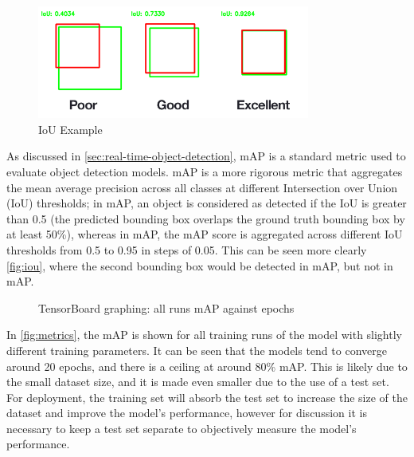 \begin{figure}[H]
    \centering
    \includegraphics[width=0.8\textwidth]{imgs/articles/iou.png}
    \caption{IoU Example \cite{rosebrock_2016}}
    \label{fig:iou}
  \end{figure}
  
As discussed in \autoref{sec:real-time-object-detection}, mAP is a standard metric used to evaluate object detection models. mAP is a more rigorous metric that aggregates the mean average precision across all classes at different Intersection over Union (IoU) thresholds; in mAP, an object is considered as detected if the IoU is greater than 0.5 (the predicted bounding box overlaps the ground truth bounding box by at least 50\%), whereas in mAP, the mAP score is aggregated across different IoU thresholds from 0.5 to 0.95 in steps of 0.05. This can be seen more clearly \autoref{fig:iou}, where the second bounding box would be detected in mAP, but not in mAP.
  
\begin{figure}[H]
  \centering
   
  \caption{TensorBoard graphing: all runs mAP against epochs}
  \label{fig:metrics}
\end{figure}
  
In \autoref{fig:metrics}, the mAP is shown for all training runs of the model with slightly different training parameters. It can be seen that the models tend to converge around 20 epochs, and there is a ceiling at around 80\% mAP. This is likely due to the small dataset size, and it is made even smaller due to the use of a test set. For deployment, the training set will absorb the test set to increase the size of the dataset and improve the model's performance, however for discussion it is necessary to keep a test set separate to objectively measure the model's performance.



